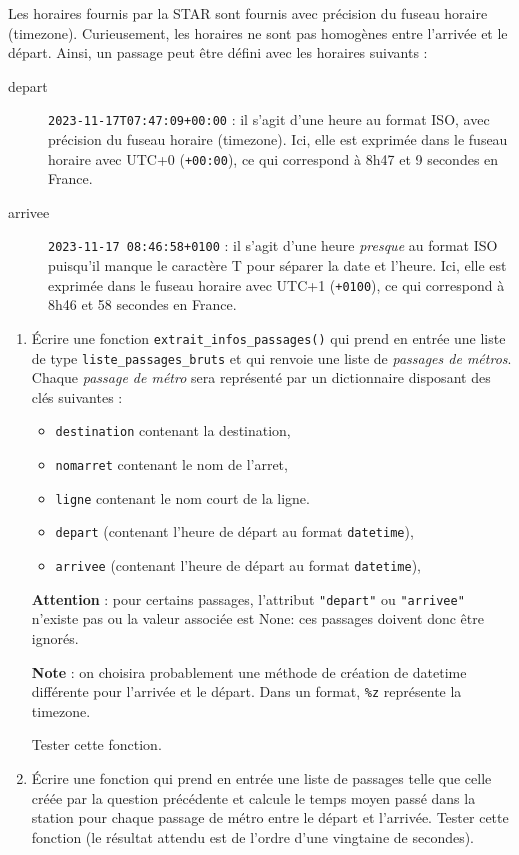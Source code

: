 \documentclass[11pt,a4paper]{article}
\begin{document}
Les horaires fournis par la STAR sont fournis avec précision du fuseau horaire (timezone). Curieusement, les horaires ne sont pas homogènes entre l'arrivée et le départ.
Ainsi, un passage peut être défini avec les horaires suivants : 
\begin{description}
    \item[depart] \verb'2023-11-17T07:47:09+00:00' : il s'agit d'une heure au format ISO, avec précision du fuseau horaire (timezone). Ici, elle est exprimée dans le fuseau horaire avec UTC+0 (\verb'+00:00'), ce qui correspond à 8h47 et 9 secondes en France.
    \item[arrivee] \verb'2023-11-17 08:46:58+0100' : il s'agit d'une heure \emph{presque} au format ISO puisqu'il manque le caractère T pour séparer la date et l'heure. Ici, elle est exprimée dans le fuseau horaire avec UTC+1 (\verb'+0100'), ce qui correspond à 8h46 et 58 secondes en France.
\end{description}


\begin{enumerate}
    \item Écrire une fonction \verb+extrait_infos_passages()+ qui prend en entrée une liste de type \verb+liste_passages_bruts+ et qui renvoie une liste de \emph{passages de métros}. Chaque \emph{passage de métro} sera représenté par un dictionnaire disposant des clés suivantes : 
    
    \begin{itemize}
        \item \verb+destination+ contenant la destination,
        \item \verb+nomarret+ contenant le nom de l'arret,
        \item \verb+ligne+ contenant le nom court de la ligne.
        \item \verb+depart+ (contenant l'heure de départ au format \verb+datetime+), 
        \item \verb+arrivee+ (contenant l'heure de départ au format \verb+datetime+), 
    \end{itemize}
        \textbf{Attention} : pour certains passages, l'attribut \verb+"depart"+ ou \verb+"arrivee"+ n'existe pas ou la valeur associée est None: ces passages doivent donc être ignorés.

        \textbf{Note} : on choisira probablement une méthode de création de datetime différente pour l'arrivée et le départ. Dans un format, \verb+%z+ représente la timezone.
    
        Tester cette fonction.
    \item Écrire une fonction qui prend en entrée une liste de passages telle que celle créée par la question 
    précédente et calcule le temps moyen passé dans la station pour chaque passage de métro entre le départ et l'arrivée.  Tester cette fonction (le résultat attendu est de l'ordre d'une vingtaine de secondes).
\end{enumerate}
\end{document}
